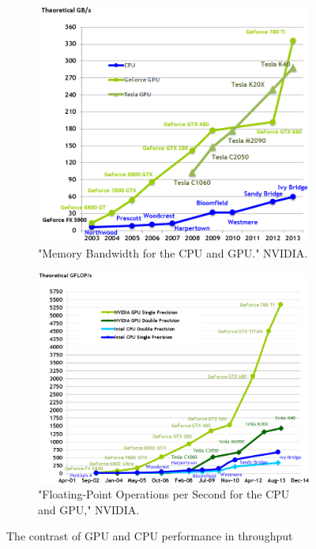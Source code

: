 \documentclass[12pt,oneside]{fithesis2}
\begin{document}
\begin{figure}[H]
	\centering
	
	\begin{subfigure}[b]{0.45\textwidth}
		\includegraphics[width=\textwidth]{figures/memory-bandwidth.png}
		\caption{"Memory Bandwidth for the CPU and GPU." NVIDIA. \cite{cuda_guide}}
	\end{subfigure}
	\hfill
	\begin{subfigure}[b]{0.45\textwidth}
		\includegraphics[width=\textwidth]{figures/floating-point-operations-per-second.png}
		\caption{"Floating-Point Operations per Second for the CPU and GPU," NVIDIA. \cite{cuda_guide}}
	\end{subfigure}
	
	\caption{The contrast of GPU and CPU performance in throughput}
	\label{fig:cpu_vs_gpu_performance}
\end{figure}
\end{document}
